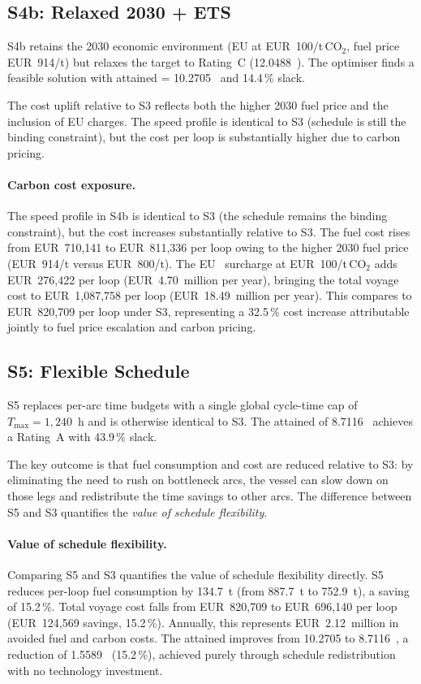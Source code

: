 \subsection{S4b: Relaxed 2030 + ETS}
\label{sec:res:s4b}

S4b retains the 2030 economic environment (EU \ETS{} at EUR~100/t\,CO$_2$,
fuel price EUR~914/t) but relaxes the target to Rating~C
(12.0488~\gGTnm{}).  The optimiser finds a feasible solution with attained
\CII{} = 10.2705~\gGTnm{} and 14.4\,\% slack.

The cost uplift relative to S3 reflects both the higher 2030 fuel price and
the inclusion of EU \ETS{} charges.  The speed profile is identical to S3
(schedule is still the binding constraint), but the cost per loop is
substantially higher due to carbon pricing.

\paragraph{Carbon cost exposure.}
The speed profile in S4b is identical to S3 (the schedule remains the binding
constraint), but the cost increases substantially relative to S3.  The fuel
cost rises from EUR~710{,}141 to EUR~811{,}336 per loop owing to the higher
2030 fuel price (EUR~914/t versus EUR~800/t).  The EU~\ETS{} surcharge at
EUR~100/t\,CO$_2$ adds EUR~276{,}422 per loop (EUR~4.70~million per year),
bringing the total voyage cost to EUR~1{,}087{,}758 per loop
(EUR~18.49~million per year).  This compares to EUR~820{,}709 per loop under
S3, representing a 32.5\,\% cost increase attributable jointly to fuel price
escalation and carbon pricing.

\subsection{S5: Flexible Schedule}
\label{sec:res:s5}

S5 replaces per-arc time budgets with a single global cycle-time cap of
$T_{\max} = 1{,}240$~h and is otherwise identical to S3.  The attained
\CII{} of 8.7116~\gGTnm{} achieves a Rating~A with 43.9\,\% slack.

The key outcome is that fuel consumption and cost are reduced relative to S3:
by eliminating the need to rush on bottleneck arcs, the vessel can slow down
on those legs and redistribute the time savings to other arcs.  The
difference between S5 and S3 quantifies the \emph{value of schedule
flexibility}.

\paragraph{Value of schedule flexibility.}
Comparing S5 and S3 quantifies the value of schedule flexibility directly.
S5 reduces per-loop fuel consumption by 134.7~t (from 887.7~t to 752.9~t),
a saving of 15.2\,\%.  Total voyage cost falls from EUR~820{,}709 to
EUR~696{,}140 per loop (EUR~124{,}569 savings, 15.2\,\%).  Annually, this
represents EUR~2.12~million in avoided fuel and carbon costs.
The attained \CII{} improves from 10.2705 to 8.7116~\gGTnm{}, a reduction
of 1.5589~\gGTnm{} (15.2\,\%), achieved purely through schedule
redistribution with no technology investment.

